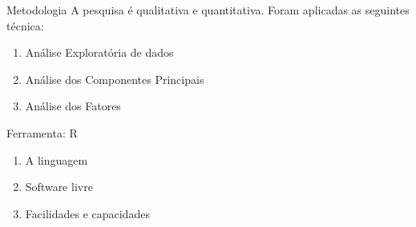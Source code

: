 \documentclass{beamer}
\begin{document}
\begin{frame}{Metodologia}
	A pesquisa é qualitativa e quantitativa. Foram aplicadas as seguintes técnica:
	\begin{enumerate}
		\item Análise Exploratória de dados
		\item Análise dos Componentes Principais
		\item Análise dos Fatores 
	\end{enumerate}
\end{frame}

\begin{frame}{Ferramenta: R} 
	\begin{enumerate}
	\item A linguagem
	\item Software livre
	\item Facilidades e capacidades

	\end{enumerate}
\end{frame}
\end{document}
